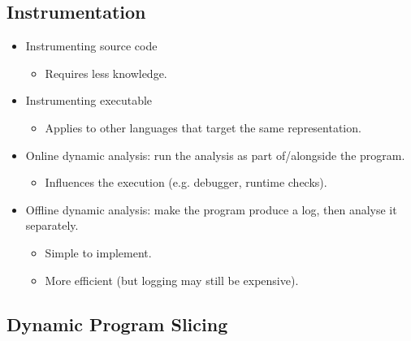 \documentclass{article}
\begin{document}
\subsection{Instrumentation}

\begin{itemize}
    \item Instrumenting source code
    \begin{itemize}
        \item Requires less knowledge.
    \end{itemize}
    \item Instrumenting executable
    \begin{itemize}
        \item Applies to other languages that target the same representation.
    \end{itemize}
    \item Online dynamic analysis: run the analysis as part of/alongside the program.
    \begin{itemize}
        \item Influences the execution (e.g. debugger, runtime checks).
    \end{itemize}
    \item Offline dynamic analysis: make the program produce a log, then analyse it separately.
    \begin{itemize}
        \item Simple to implement.
        \item More efficient (but logging may still be expensive).
    \end{itemize}
\end{itemize}

\subsection{Dynamic Program Slicing}
\end{document}

